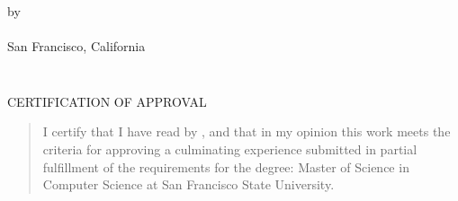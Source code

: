 \documentclass[12pt,oneside]{sfsuthesis}
\theoremstyle{plain} %
\theoremstyle{definition}  %
\theoremstyle{remark}  %
\begin{document}
\thispagestyle{empty}

\[ \]
\vspace{-1.8in}

\begin{center}
{\mytitle}

\vspace{1.4in}


\vspace{.5in}


\vspace*{\fill}

{by \\[12pt] 
\myname \\[12pt]
San Francisco, California\\[12pt]
\thismonth
\thisyear}
\end{center}

\newpage
\thispagestyle{empty}

$\mbox{}$
\vspace{3in}
\begin{center}
\end{center}

\newpage
\thispagestyle{empty}
\[ \]
\vspace{-1.8in}
\begin{center}
{CERTIFICATION OF APPROVAL}
\end{center}
\vspace{.5in}
\begin{quote}
I certify that I have read {\it \mytitle} by \myname, and that in my opinion
this work meets the criteria for approving a culminating experience submitted in
partial fulfillment of the requirements for the degree: Master of Science in Computer
Science at San Francisco State University.
\end{quote}
\end{document}
